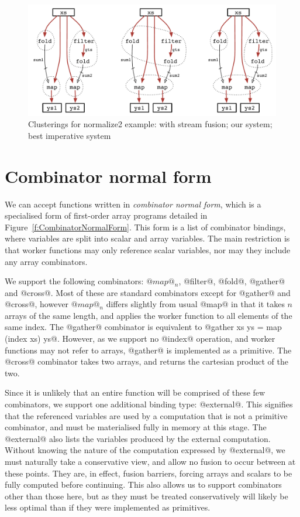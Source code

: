 
\begin{figure}[ht!]
\begin{center}
\includegraphics[scale=0.5]{figures/ex1-compare.pdf}
\end{center}

\caption{Clusterings for normalize2 example: with stream fusion; our system; best imperative system}
\label{f:normalize2-cluterings}
\end{figure}


\section{Combinator normal form}
We can accept functions written in \emph{combinator normal form}, which is a specialised form of first-order array programs detailed in Figure~\ref{f:CombinatorNormalForm}.
This form is a list of combinator bindings, where variables are split into scalar and array variables.
The main restriction is that worker functions may only reference scalar variables, nor may they include any array combinators.

We support the following combinators: $@map@_n$, @filter@, @fold@, @gather@ and @cross@.
Most of these are standard combinators except for @gather@ and @cross@, however $@map@_n$ differs slightly from usual @map@ in that it takes $n$ arrays of the same length, and applies the worker function to all elements of the same index.
The @gather@ combinator is equivalent to @gather xs ys = map (index xs) ys@.
However, as we support no @index@ operation, and worker functions may not refer to arrays, @gather@ is implemented as a primitive.
The @cross@ combinator takes two arrays, and returns the cartesian product of the two.

Since it is unlikely that an entire function will be comprised of these few combinators, we support one additional binding type: @external@.
This signifies that the referenced variables are used by a computation that is not a primitive combinator, and must be materialised fully in memory at this stage.
The @external@ also lists the variables produced by the external computation.
Without knowing the nature of the computation expressed by @external@, we must naturally take a conservative view, and allow no fusion to occur between at these points. They are, in effect, fusion barriers, forcing arrays and scalars to be fully computed before continuing.
This also allows us to support combinators other than those here, but as they must be treated conservatively will likely be less optimal than if they were implemented as primitives.

